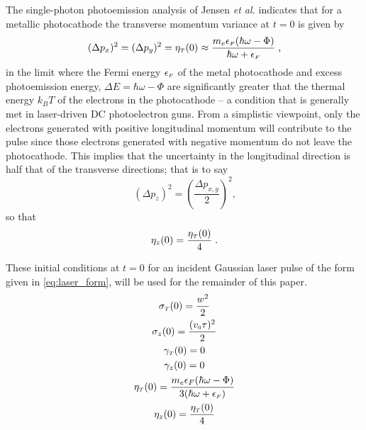 The single-photon photoemission analysis of Jensen \textit{et al.}\cite{jensen_theoretical_2006} indicates that for a metallic photocathode the transverse momentum variance at $ t = 0 $ is given by
\begin{equation} \label{eq:jensen_eta}
( \Delta p_{x} )^{2} = ( \Delta p_{y} )^{2} = \eta_{ {\scriptscriptstyle T} } ( 0 ) \approx \frac{ m_{e} \epsilon_{{ \scriptscriptstyle F }} ( \hbar \omega - \Phi ) } { \hbar \omega + \epsilon_{{ \scriptscriptstyle F }} } \; \text{,}
\end{equation}
in the limit where the Fermi energy $ \epsilon_{{ \scriptscriptstyle F }} $ of the metal photocathode and excess photoemission energy, $ \Delta E = \hbar \omega - \Phi $ are significantly greater that the thermal energy $ k_{B} T $ of the electrons in the photocathode -- a condition that is generally met in laser-driven DC photoelectron guns.
From a simplistic viewpoint, only the electrons generated with positive longitudinal momentum will contribute to the pulse since those electrons generated with negative momentum do not leave the photocathode.
This implies that the uncertainty in the longitudinal direction is half that of the transverse directions; that is to say
\begin{equation}
( \Delta p_{ z } )^{2} = \left ( \frac{\Delta p_{ x , y }}{ 2 } \right )^{2} \text{,}
\end{equation}
so that
\begin{equation}
\eta_{ z } ( 0 ) = \frac{ \eta_{ {\scriptscriptstyle T} } ( 0 )}{ 4 } \; \text{.}
\end{equation}

These initial conditions at $t=0$ for an incident Gaussian laser pulse of the form given in \ref{eq:laser_form}, will be used for the remainder of this paper.
\begin{subequations} \label{eq:summary}
\begin{gather}
\sigma_{ {\scriptscriptstyle T} } ( 0 ) = \frac{ w^{ 2 } }{ 2 } \\
\sigma_{ z } ( 0 ) = \frac{ ( v_{{ \scriptscriptstyle 0}} \tau )^{ 2 } }{ 2 } \\
\gamma_{ {\scriptscriptstyle T} } ( 0 ) = 0 \\
\gamma_{ z } ( 0 ) = 0 \\
\eta_{ {\scriptscriptstyle T} } ( 0 ) = \frac{ m_{e} \epsilon_{ F } ( \hbar \omega - \Phi ) }{ 3 ( \hbar \omega + \epsilon_{ { \scriptscriptstyle F } } ) } \\
\eta_{ z } ( 0 ) = \frac{ \eta_{ {\scriptscriptstyle T} } ( 0 ) }{ 4 }
\end{gather}
\end{subequations}


